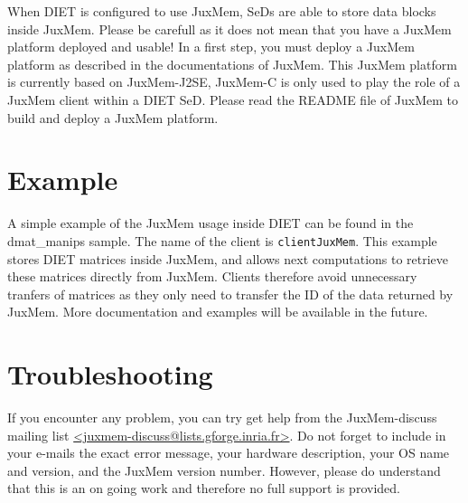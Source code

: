 When DIET is configured to use JuxMem, SeDs are able to store data
blocks inside JuxMem. Please be carefull as it does not mean that you
have a JuxMem platform deployed and usable!  In a first step, you must
deploy a JuxMem platform as described in the documentations of
JuxMem. This JuxMem platform is currently based on JuxMem-J2SE,
JuxMem-C is only used to play the role of a JuxMem client within a
DIET SeD. Please read the README file of JuxMem to build and deploy
a JuxMem platform.

\section{Example}

A simple example of the JuxMem usage inside DIET can be found in the
dmat\_manips sample. The name of the client is
\texttt{clientJuxMem}. This example stores DIET matrices inside JuxMem, 
and allows next computations to retrieve these matrices directly from
JuxMem. Clients therefore avoid unnecessary tranfers of matrices as
they only need to transfer the ID of the data returned by JuxMem. More
documentation and examples will be available in the future.

\section{Troubleshooting}

If you encounter any problem, you can try get help from the
JuxMem-discuss mailing list
\url{<juxmem-discuss@lists.gforge.inria.fr>}. Do not forget to include
in your e-mails the exact error message, your hardware description,
your OS name and version, and the JuxMem version number.  However,
please do understand that this is an on going work and therefore no
full support is provided.
